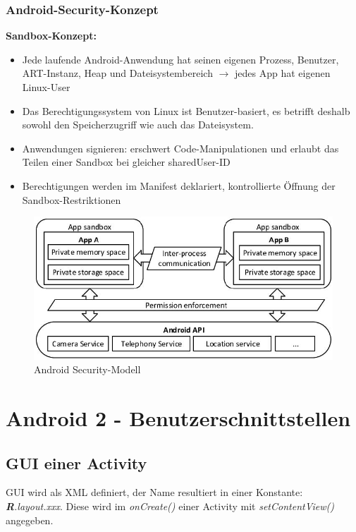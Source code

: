 \documentclass[a4paper]{article}
\begin{document}
\subsubsection{Android-Security-Konzept}
\textbf{Sandbox-Konzept:} 
\begin{itemize}
	\item Jede laufende Android-Anwendung hat seinen eigenen Prozess, Benutzer, ART-Instanz, Heap und Dateisystembereich $\rightarrow$ jedes App hat eigenen Linux-User
	\item Das Berechtigungssystem von Linux ist Benutzer-basiert, es betrifft deshalb sowohl den Speicherzugriff wie auch das Dateisystem. 
	\item Anwendungen signieren: erschwert Code-Manipulationen und erlaubt das Teilen einer Sandbox bei gleicher sharedUser-ID
	\item Berechtigungen werden im Manifest deklariert, kontrollierte Öffnung der Sandbox-Restriktionen
\end{itemize}
\begin{figure}[htb!]
	\centering
	\includegraphics[width=12cm]{img/securitymodel.jpg}
	\caption{Android Security-Modell}
	\label{fig:secumodel}
\end{figure}

\newpage
\section{Android 2 - Benutzerschnittstellen}

\subsection{GUI einer Activity}

GUI wird als XML definiert, der Name resultiert in einer Konstante: \textit{\textbf{R}.layout.xxx}. Diese wird im \textit{onCreate()} einer Activity mit \textit{setContentView()} angegeben.
\end{document}
